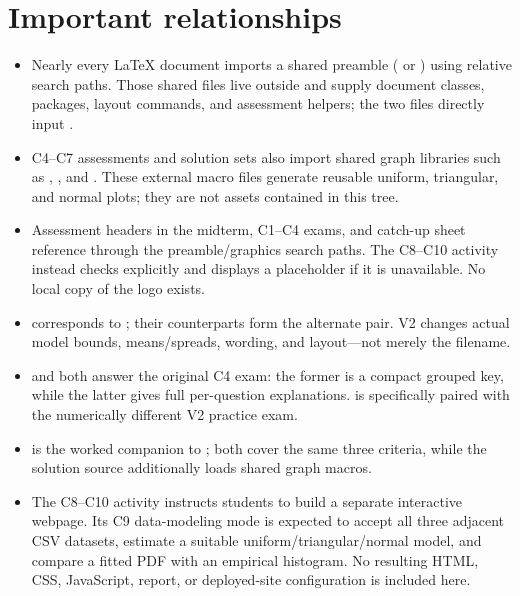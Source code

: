 \section{Important relationships}

\begin{itemize}
\item Nearly every LaTeX document imports a shared preamble ( or ) using relative search paths. Those shared files live outside  and supply document classes, packages, layout commands, and assessment helpers; the two  files directly input .
\item C4–C7 assessments and solution sets also import shared graph libraries such as , , and . These external macro files generate reusable uniform, triangular, and normal plots; they are not assets contained in this tree.
\item Assessment headers in the midterm, C1–C4 exams, and catch-up sheet reference  through the preamble/graphics search paths. The C8–C10 activity instead checks  explicitly and displays a placeholder if it is unavailable. No local copy of the logo exists.
\item {} corresponds to ; their  counterparts form the alternate pair. V2 changes actual model bounds, means/spreads, wording, and layout—not merely the filename.
\item {} and  both answer the original C4 exam: the former is a compact grouped key, while the latter gives full per-question explanations.  is specifically paired with the numerically different V2 practice exam.
\item {} is the worked companion to ; both cover the same three criteria, while the solution source additionally loads shared graph macros.
\item The C8–C10 activity instructs students to build a separate interactive webpage. Its C9 data-modeling mode is expected to accept all three adjacent CSV datasets, estimate a suitable uniform/triangular/normal model, and compare a fitted PDF with an empirical histogram. No resulting HTML, CSS, JavaScript, report, or deployed-site configuration is included here.

\end{itemize}
